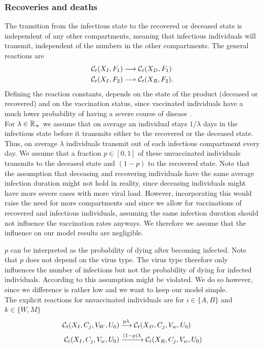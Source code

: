 \subsubsection{Recoveries and deaths}
The transition from the infectious state to the recovered or deceased state is independent of any other compartments, meaning that infectious individuals will transmit, independent of the numbers in the other compartments. The general reactions are
\begin{align}
\label{eq:recovery}
    \mathcal{C}_t(X_I, F_1) & \longrightarrow  \mathcal{C}_t(X_D, F_1) \\
    \mathcal{C}_t(X_I, F_2) & \longrightarrow  \mathcal{C}_t(X_R, F_2). \notag
\end{align}
Defining the reaction constants, depends on the state of the product (deceased or recovered) and on the vaccination status, since vaccinated individuals have a much lower probability of having a severe course of disease \citep{Tenforde.2021, Voysey.2021}. \\

For $\lambda \in \mathbb{R}_+$ we assume that on average an individual stays $1/\lambda$ days in the infectious state before it transmits either to the recovered or the deceased state. Thus, on average $\lambda$ individuals transmit out of each infectious compartment every day. We assume that a fraction $p \in [0,1]$ of these unvaccinated individuals transmits to the deceased state and $(1-p)$ to the recovered state. Note that the assumption that deceasing and recovering individuals have the same average infection duration might not hold in reality, since deceasing individuals might have more severe cases with more viral load. However, incorporating this would raise the need for more compartments and since we allow for vaccinations of recovered and infectious individuals, assuming the same infection duration should not influence the vaccination rates anyways. We therefore we assume that the influence on our model results are negligible.
 
$p$ can be interpreted as the probability of dying after becoming infected. Note that $p$ does not depend on the virus type. The virus type therefore only influences the number of infections but not the probability of dying for infected individuals. According to \cite{Davies.2021} this assumption might be violated. We do so however, since we difference is rather low and we want to keep our model simple. \\

The explicit reactions for unvaccinated individuals are for $i \in \{A, B\}$ and $k \in \{W, M\}$
\begin{align}
    \mathcal{C}_t(X_I, C_j, V_W, U_0) &\xrightarrow{p \lambda} \mathcal{C}_t(X_D,C_j, V_w, U_0)  \\
    \mathcal{C}_t(X_I, C_j, V_w, U_0) &\xrightarrow{(1-p) \lambda} \mathcal{C}_t(X_R,C_j, V_w, U_0) \notag
\end{align}

